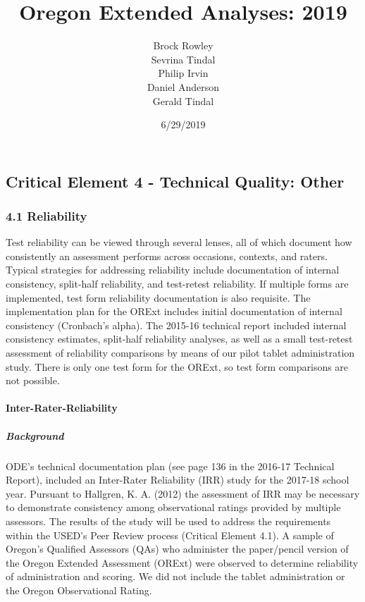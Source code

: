 \documentclass[]{article}
\title{Oregon Extended Analyses: 2019}
\author{Brock Rowley \\ Sevrina Tindal \\ Philip Irvin \\ Daniel Anderson \\ Gerald Tindal}
\date{6/29/2019}
\let\oldparagraph\paragraph
\renewcommand{\paragraph}[1]{\oldparagraph{#1}\mbox{}}
\let\oldsubparagraph\subparagraph
\renewcommand{\subparagraph}[1]{\oldsubparagraph{#1}\mbox{}}
\begin{document}
\maketitle

{
\setcounter{tocdepth}{5}
\tableofcontents
}
\hypertarget{critical-element-4---technical-quality-other}{%
\subsection{Critical Element 4 - Technical Quality:
Other}\label{critical-element-4---technical-quality-other}}

\hypertarget{reliability}{%
\subsubsection{4.1 Reliability}\label{reliability}}

Test reliability can be viewed through several lenses, all of which
document how consistently an assessment performs across occasions,
contexts, and raters. Typical strategies for addressing reliability
include documentation of internal consistency, split-half reliability,
and test-retest reliability. If multiple forms are implemented, test
form reliability documentation is also requisite. The implementation
plan for the ORExt includes initial documentation of internal
consistency (Cronbach's alpha). The 2015-16 technical report included
internal consistency estimates, split-half reliability analyses, as well
as a small test-retest assessment of reliability comparisons by means of
our pilot tablet administration study. There is only one test form for
the ORExt, so test form comparisons are not possible. \newpage

\hypertarget{inter-rater-reliability}{%
\paragraph{Inter-Rater-Reliability}\label{inter-rater-reliability}}

\hypertarget{background}{%
\subparagraph{Background}\label{background}}

ODE's technical documentation plan (see page 136 in the 2016-17
Technical Report), included an Inter-Rater Reliability (IRR) study for
the 2017-18 school year. Pursuant to Hallgren, K. A. (2012) the
assessment of IRR may be necessary to demonstrate consistency among
observational ratings provided by multiple assessors. The results of the
study will be used to address the requirements within the USED's Peer
Review process (Critical Element 4.1). A sample of Oregon's Qualified
Assessors (QAs) who administer the paper/pencil version of the Oregon
Extended Assessment (ORExt) were observed to determine reliability of
administration and scoring. We did not include the tablet administration
or the Oregon Observational Rating.
\end{document}
